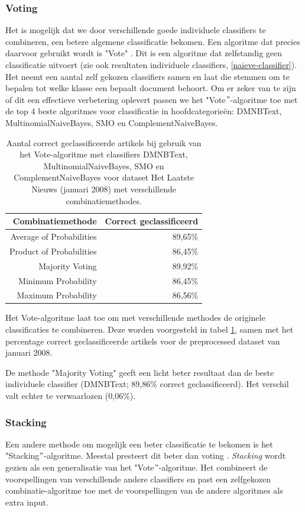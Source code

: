 \subsubsection{Voting}
Het is mogelijk dat we door verschillende goede individuele classifiers te combineren, een betere algemene classificatie bekomen. Een algoritme dat precies daarvoor gebruikt wordt is "Vote"  \cite{Kittler1998}. Dit is een algoritme dat zelfstandig geen classificatie uitvoert (zie ook resultaten individuele classifiers, \ref{naieve-classifier}). Het neemt een aantal zelf gekozen classifiers samen en laat die stemmen om te bepalen tot welke klasse een bepaalt document behoort. Om er zeker van te zijn of dit een effectieve verbetering oplevert passen we het "Vote$"$-algoritme toe met de top 4 beste algoritmes voor classificatie in hoofdcategorie\"en: DMNBText, MultinomialNaiveBayes, SMO en ComplementNaiveBayes. 

\begin{table}[htbp]
	\centering
	\caption{Aantal correct geclassificeerde artikels bij gebruik van het Vote-algoritme met classifiers DMNBText, MultinomialNaiveBayes, SMO en ComplementNaiveBayes voor dataset Het Laatste Nieuws (januari 2008) met verschillende combinatiemethodes.}
	\begin{tabular}{rr}
		\toprule
		Combinatiemethode & Correct geclassificeerd \\
		\midrule
		Average of Probabilities & 89,65\% \\
		Product of Probabilities & 86,45\% \\
		Majority Voting & 89,92\% \\
		Minimum Probability & 86,45\% \\
		Maximum Probability & 86,56\% \\
		\bottomrule
	\end{tabular}%
	\label{tab:vote}%
\end{table}%

Het Vote-algoritme laat toe om met verschillende methodes de originele classificaties te combineren. Deze worden voorgesteld in tabel \ref{tab:vote}, samen met het percentage correct geclassificeerde artikels voor de preprocessed dataset van januari 2008.

De methode "Majority Voting" geeft een licht beter resultaat dan de beste individuele classifier (DMNBText; 89,86\% correct geclassificeerd). Het verschil valt echter te verwaarlozen (0,06\%). 

\subsubsection{Stacking}\label{stacking}
Een andere methode om mogelijk een beter classificatie te bekomen is het "Stacking$"$-algoritme. Meestal presteert dit beter dan voting \cite{Sigletos2005}. \textit{\textit{Stacking\textit{}}} wordt gezien als een generalisatie van het "Vote$"$-algoritme. Het combineert de voorspellingen van verschillende andere classifiers en past een zelfgekozen combinatie-algoritme toe met de voorspellingen van de andere algoritmes als extra input. 

